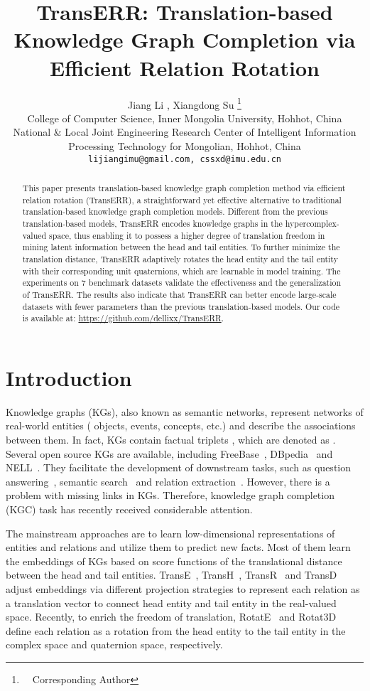 \documentclass[11pt]{article}
\title{TransERR: Translation-based Knowledge Graph Completion via Efficient Relation Rotation}
\author{Jiang Li ,  Xiangdong Su \thanks{\ \ Corresponding Author} \\
 College of Computer Science, Inner Mongolia University, Hohhot, China \\  National \& Local Joint Engineering Research Center of Intelligent Information \\ Processing Technology for Mongolian, Hohhot, China \\ \texttt{lijiangimu@gmail.com, cssxd@imu.edu.cn}}
\begin{document}
\maketitle
\begin{abstract}
	This paper presents translation-based knowledge graph completion method via efficient relation rotation (TransERR), a straightforward yet effective alternative to traditional translation-based knowledge graph completion models. Different from the previous translation-based models, TransERR encodes knowledge graphs in the hypercomplex-valued space, thus enabling it to possess a higher degree of translation freedom in mining latent information between the head and tail entities. To further minimize the translation distance, TransERR adaptively rotates the head entity and the tail entity with their corresponding unit quaternions, which are learnable in model training.  The experiments on 7 benchmark datasets validate the effectiveness and the generalization of TransERR. The results also indicate that TransERR can better encode large-scale datasets with fewer parameters than the previous translation-based models. Our code is available at: \url{https://github.com/dellixx/TransERR}.

\end{abstract}

\section{Introduction}
Knowledge graphs (KGs), also known as semantic networks, represent networks of real-world entities ( objects, events, concepts, etc.) and describe the associations between them. In fact, KGs contain factual triplets , which are denoted as . Several open source KGs are available, including FreeBase~\cite{4bollacker2008freebase}, DBpedia~\cite{45lehmann2015dbpedia} and  NELL~\cite{46mitchell2018never}. They facilitate the development of downstream tasks, such as question answering~\cite{2}, semantic search~\cite{3junior2020knowledge} and relation extraction~\cite{1}. However, there is a problem with missing links in KGs. Therefore,  knowledge graph completion (KGC) task has recently received considerable attention.

The mainstream approaches are to learn low-dimensional representations of entities and relations and utilize them to predict new facts. Most of them learn the embeddings of KGs based on score functions of the translational distance between the head and tail entities. TransE~\cite{7bordes2013translating}, TransH~\cite{81wang2014knowledge}, TransR~\cite{9lin2015learning} and TransD~\cite{10ji2015knowledge} adjust embeddings via different projection strategies to represent each relation as a translation vector  to connect head entity  and tail entity  in the real-valued space. 
Recently, to enrich the freedom of translation, RotatE~\cite{31sun2019rotate} and Rotat3D~\cite{15gao2020rotate3d} define each relation as a rotation from  the head entity to the tail entity in the complex space and quaternion space, respectively.
\end{document}
